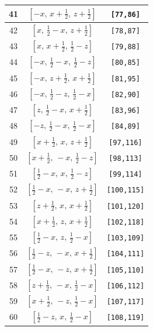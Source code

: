 \documentclass[fleqn,8pt]{jsarticle}
\begin{document}
\begin{longtable}{ccc}
41 & $\left[ - x,\, x + \frac{1}{2},\, z + \frac{1}{2} \right]$ & {\tt [77,86]} \\ \hline
42 & $\left[ x,\, \frac{1}{2} - x,\, z + \frac{1}{2} \right]$ & {\tt [78,87]} \\ \hline
43 & $\left[ x,\, x + \frac{1}{2},\, \frac{1}{2} - z \right]$ & {\tt [79,88]} \\ \hline
44 & $\left[ - x,\, \frac{1}{2} - x,\, \frac{1}{2} - z \right]$ & {\tt [80,85]} \\ \hline
45 & $\left[ - x,\, z + \frac{1}{2},\, x + \frac{1}{2} \right]$ & {\tt [81,95]} \\ \hline
46 & $\left[ - x,\, \frac{1}{2} - z,\, \frac{1}{2} - x \right]$ & {\tt [82,90]} \\ \hline
47 & $\left[ z,\, \frac{1}{2} - x,\, x + \frac{1}{2} \right]$ & {\tt [83,96]} \\ \hline
48 & $\left[ - z,\, \frac{1}{2} - x,\, \frac{1}{2} - x \right]$ & {\tt [84,89]} \\ \hline
49 & $\left[ x + \frac{1}{2},\, x,\, z + \frac{1}{2} \right]$ & {\tt [97,116]} \\ \hline
50 & $\left[ x + \frac{1}{2},\, - x,\, \frac{1}{2} - z \right]$ & {\tt [98,113]} \\ \hline
51 & $\left[ \frac{1}{2} - x,\, x,\, \frac{1}{2} - z \right]$ & {\tt [99,114]} \\ \hline
52 & $\left[ \frac{1}{2} - x,\, - x,\, z + \frac{1}{2} \right]$ & {\tt [100,115]} \\ \hline
53 & $\left[ z + \frac{1}{2},\, x,\, x + \frac{1}{2} \right]$ & {\tt [101,120]} \\ \hline
54 & $\left[ x + \frac{1}{2},\, z,\, x + \frac{1}{2} \right]$ & {\tt [102,118]} \\ \hline
55 & $\left[ \frac{1}{2} - x,\, z,\, \frac{1}{2} - x \right]$ & {\tt [103,109]} \\ \hline
56 & $\left[ \frac{1}{2} - z,\, - x,\, x + \frac{1}{2} \right]$ & {\tt [104,111]} \\ \hline
57 & $\left[ \frac{1}{2} - x,\, - z,\, x + \frac{1}{2} \right]$ & {\tt [105,110]} \\ \hline
58 & $\left[ z + \frac{1}{2},\, - x,\, \frac{1}{2} - x \right]$ & {\tt [106,112]} \\ \hline
59 & $\left[ x + \frac{1}{2},\, - z,\, \frac{1}{2} - x \right]$ & {\tt [107,117]} \\ \hline
60 & $\left[ \frac{1}{2} - z,\, x,\, \frac{1}{2} - x \right]$ & {\tt [108,119]} \\ \hline

\end{longtable}
\end{document}
